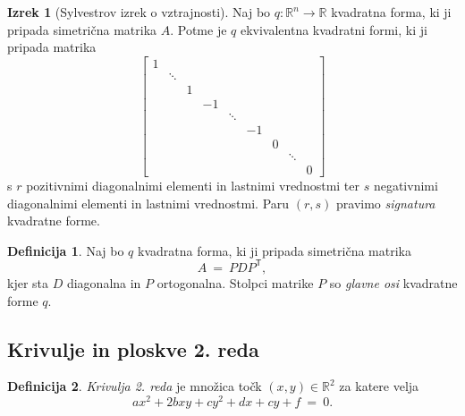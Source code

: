 \documentclass[11pt]{article}
\newcommand{\R}{\mathbb{R}}
\newcommand{\0}{\mathbf{0}}
\newcommand{\T}{\mathsf{T}}
\theoremstyle{definition}
\newtheorem{definicija}{Definicija}[section]
\theoremstyle{definition}
\theoremstyle{definition}
\newtheorem{izrek}{Izrek}[section]
\theoremstyle{definition}
\begin{document}
\begin{izrek}[Sylvestrov izrek o vztrajnosti]

Naj bo $q: \R^n \rightarrow \R$ kvadratna forma, ki ji pripada simetrična matrika $A$. Potme je $q$ ekvivalentna kvadratni formi, ki ji pripada matrika
$$\begin{bmatrix}
1 & ~ & ~ & ~ & ~ & ~ & ~ & ~ & ~ \\
~ & \ddots & ~ & ~ & ~ & ~ & ~ & ~ & ~ \\
~ & ~ & 1 & ~ & ~ & ~ & ~ & ~ & ~ \\
~ & ~ & ~ & -1 & ~ & ~ & ~ & ~ & ~ \\
~ & ~ & ~ & ~ & \ddots & ~ & ~ & ~ & ~ \\
~ & ~ & ~ & ~ & ~ & -1 & ~ & ~ & ~ \\
~ & ~ & ~ & ~ & ~ & ~ & 0 & ~ & ~ \\
~ & ~ & ~ & ~ & ~ & ~ & ~ & \ddots & ~ \\
~ & ~ & ~ & ~ & ~ & ~ & ~ & ~ & 0
\end{bmatrix}$$
s $r$ pozitivnimi diagonalnimi elementi in lastnimi vrednostmi ter $s$ negativnimi diagonalnimi elementi in lastnimi vrednostmi. Paru $(r,s)$ pravimo \textit{signatura} kvadratne forme.

\end{izrek}
\vspace{0.5cm}

\begin{definicija}

Naj bo $q$ kvadratna forma, ki ji pripada simetrična matrika 
$$A ~=~ PDP^\T,$$
kjer sta $D$ diagonalna in $P$ ortogonalna. Stolpci matrike $P$ so \textit{glavne osi} kvadratne forme $q$.

\end{definicija}
\vspace{0.5cm}


\subsection{Krivulje in ploskve 2. reda}
\vspace{0.5cm}

\begin{definicija}

\textit{Krivulja 2. reda} je množica točk $(x,y) \in \R^2$ za katere velja
$$ax^2 + 2bxy + cy^2 + dx + cy + f ~=~ 0.$$

\end{definicija}
\vspace{0.5cm}
\end{document}
